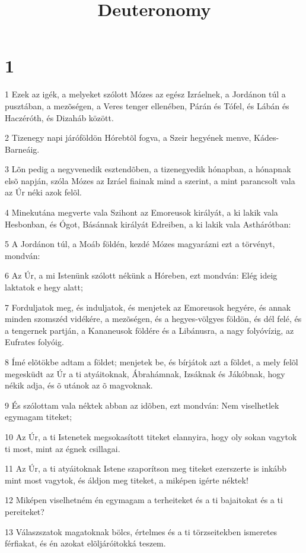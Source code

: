 

\title{Deuteronomy}


\chapter{1}

\par 1 Ezek az igék, a melyeket szólott Mózes az egész Izráelnek, a Jordánon túl a pusztában, a mezõségen, a Veres tenger ellenében, Párán és Tófel, és Lábán és Haczéróth, és Dizaháb között.
\par 2 Tizenegy napi járóföldön Hórebtõl fogva, a Szeir hegyének  menve, Kádes-Barneáig.
\par 3 Lõn pedig a negyvenedik esztendõben, a tizenegyedik hónapban, a hónapnak elsõ napján, szóla Mózes az Izráel fiainak mind a szerint, a mint parancsolt vala az Úr néki azok felõl.
\par 4 Minekutána megverte vala Szihont az Emoreusok királyát, a ki lakik vala Hesbonban, és Ógot, Básánnak királyát Edreiben, a ki lakik vala Asthárótban:
\par 5 A Jordánon túl, a Moáb földén, kezdé Mózes magyarázni ezt a törvényt, mondván:
\par 6 Az Úr, a mi Istenünk szólott nékünk a Hóreben, ezt mondván: Elég ideig laktatok e hegy alatt;
\par 7 Forduljatok meg, és induljatok, és menjetek az Emoreusok hegyére, és annak minden szomszéd vidékére, a mezõségen, és a hegyes-völgyes földön, és dél felé, és a tengernek partján, a Kananeusok földére és a Libánusra, a nagy folyóvízig, az Eufrates folyóig.
\par 8 Ímé elõtökbe adtam a földet; menjetek be, és bírjátok azt a földet, a mely felõl megesküdt az Úr a ti atyáitoknak, Ábrahámnak, Izsáknak és Jákóbnak, hogy nékik adja, és õ utánok az õ magvoknak.
\par 9 És szólottam vala néktek abban az idõben, ezt mondván: Nem viselhetlek egymagam titeket;
\par 10 Az Úr, a ti Istenetek megsokasított titeket elannyira, hogy oly sokan vagytok ti most, mint az égnek csillagai.
\par 11 Az Úr, a ti atyáitoknak Istene szaporítson meg titeket ezerszerte is inkább mint most vagytok, és áldjon meg titeket, a miképen igérte néktek!
\par 12 Miképen viselhetném én egymagam a terheiteket és a ti bajaitokat és a ti pereiteket?
\par 13 Válaszszatok magatoknak bölcs, értelmes és a ti törzseitekben ismeretes férfiakat, és én azokat elõljáróitokká teszem.
